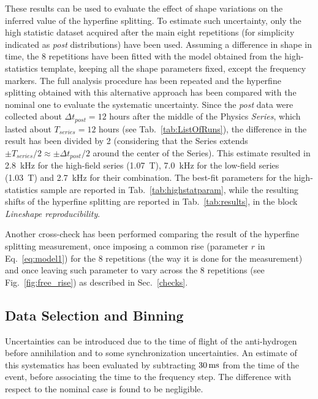 These results can be used to evaluate the effect of shape variations on the inferred value of the hyperfine splitting. To estimate such uncertainty, only the high statistic dataset acquired after the main eight repetitions (for simplicity indicated as {\it post} distributions) have been used. Assuming a difference in shape in time, the 8 repetitions have been fitted with the model obtained from the high-statistics template, keeping all the shape parameters fixed, except the frequency markers. The full analysis procedure has been repeated and the hyperfine splitting obtained with this alternative approach has been compared with the nominal one to evaluate the systematic uncertainty. 
Since the {\it post} data were collected about $\Delta t_{post} = 12$ hours after the middle of the Physics {\it Series}, which lasted about $T_{series} = 12$ hours (see Tab.~\ref{tab:ListOfRuns}), the difference in the result has been divided by 2 (considering that the Series extends $\pm T_{series}/2 \approx \pm \Delta t_{post}/2$ around the center of the Series). This estimate resulted in \SI{2.8}{\kilo\hertz} for the high-field series (\SI{1.07}{\tesla}), \SI{7.0}{\kilo\hertz} for the low-field series (\SI{1.03}{\tesla}) and \SI{2.7}{\kilo\hertz} for their combination. The best-fit parameters for the high-statistics sample are reported in Tab.~\ref{tab:highstatparam}, while the resulting shifts of the hyperfine splitting are reported in Tab.~\ref{tab:results}, in the block \textit{Lineshape reproducibility}.

Another cross-check has been performed comparing the result of the hyperfine splitting measurement, once imposing a common rise (parameter $r$ in Eq.~\ref{eq:model1}) for the 8 repetitions (the way it is done for the measurement) and once leaving such parameter to vary across the 8 repetitions (see Fig.~\ref{fig:free_rise}) as described in Sec.~\ref{checks}. 



\subsection{Data Selection and Binning}

Uncertainties can be introduced due to the time of flight of the anti-hydrogen before annihilation and to some synchronization uncertainties. An estimate of this systematics has been evaluated by subtracting $30\,{\rm ms}$ from the time of the event, before associating the time to the frequency step. The difference with respect to the nominal case is found to be negligible. 

